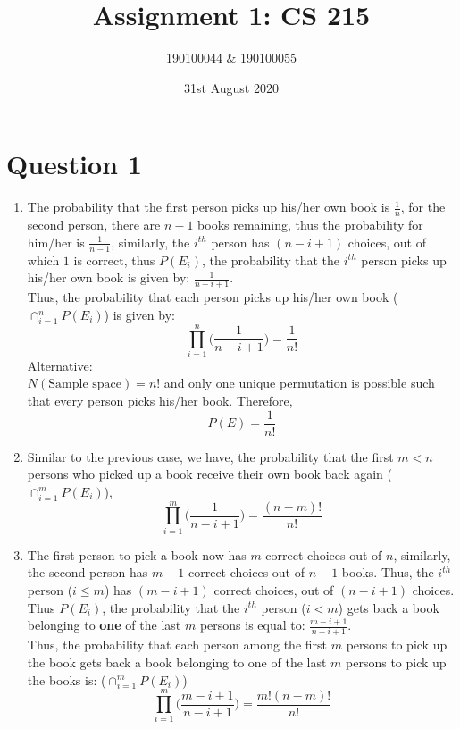 \documentclass[11pt]{article}
\title{Assignment 1: CS 215}
\author{190100044 \& 190100055}
\date{31st August 2020}
\begin{document}
\maketitle
\tableofcontents
\thispagestyle{empty}
\setcounter{page}{0}



\newpage
\section*{Question 1}
\begin{enumerate}[label=(\alph*)]
    \item The probability that the first person picks up his/her own book is $\frac{1}{n}$, for the second person, there are $n-1$ books remaining, thus the probability for him/her is $\frac{1}{n-1}$, similarly, the $i^{th}$ person has $ (n-i+1) $ choices, out of which $1$ is correct, thus $P(E_i)$, the probability that the $i^{th}$ person picks up his/her own book is given by: $\frac{1}{n-i+1}$.\\
          Thus, the probability that each person picks up his/her own book ($ \cap_{i=1}^{n} P(E_i) $) is given by:
          $$ \prod_{i=1}^n \Big( \frac{1}{n-i+1} \Big) = \frac{1}{n!}$$
          Alternative:\\
          $N(\text{Sample space}) = n!$ and only one unique permutation is possible such that every person picks his/her book. Therefore,
          $$ P(E) = \frac{1}{n!} $$

    \item Similar to the previous case, we have, the probability that the first $ m < n $ persons who picked up a book receive their own book back again ($ \cap_{i=1}^{m} P(E_i) $),
          $$ \prod_{i=1}^m \Big( \frac{1}{n-i+1} \Big) = \frac{(n-m)!}{n!} $$

    \item The first person to pick a book now has $m$ correct choices out of $n$, similarly, the second person has $m-1$ correct choices out of $n-1$ books. Thus, the $i^{th}$ person ($ i \le m $) has $ (m-i+1) $ correct choices, out of $(n-i+1)$ choices. Thus $P(E_i)$, the probability that the $i^{th}$ person ($i < m$) gets back a book belonging to \textbf{one} of the last $m$ persons is equal to: $\frac{m-i+1}{n-i+1}$.\\
          Thus, the probability that each person among the first $m$ persons to pick up the book gets back a book belonging to one of the last $m$ persons to pick up the books is: ($ \cap_{i=1}^{m} P(E_i) $)
          $$ \prod_{i=1}^m \Big( \frac{m-i+1}{n-i+1} \Big) = \frac{m!(n-m)!}{n!} $$


\end{enumerate}
\end{document}
